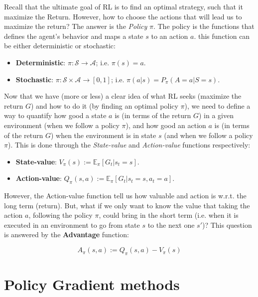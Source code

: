 \documentclass[twoside,twocolumn]{article}
\begin{document}
Recall that the ultimate goal of RL is to find an optimal strategy, such that it maximize the Return. However, how to choose the actions that will lead us to maximize the return? The answer is the \emph{Policy} $\pi$. The policy is the functions that defines the agent’s behavior and maps a state $s$ to an action $a$. this function can be either deterministic or stochastic:

\begin{itemize}
  \item \textbf{Deterministic}: $\pi: \mathcal{S} \rightarrow \mathcal{A}$; i.e. $\pi(s)=a$.
  \item \textbf{Stochastic}: $\pi: \mathcal{S} \times \mathcal{A} \rightarrow [0, 1]$; i.e. $\pi(a|s)=P_{\pi}(A=a|S=s)$.
\end{itemize}

Now that we have (more or less) a clear idea of what RL seeks (maximize the return $G$) and how to do it (by finding an optimal policy $\pi$), we need to define a way to quantify how good a state $a$ is (in terms of the return $G$) in a given environment (when we follow a policy $\pi$), and how good an action $a$ is (in terms of the return $G$) when the environment is in state $s$ (and when we follow a policy $\pi$). This is done through the \emph{State-value} and \emph{Action-value} functions respectively:
\begin{itemize}
    \item \textbf{State-value}: $V_{\pi}(s):= \mathbb{E}_{\pi}[G_t|s_t=s]$.
    \item \textbf{Action-value}: $Q_{\pi}(s, a):= \mathbb{E}_{\pi}[G_t|s_t=s, a_t=a]$.
\end{itemize}

\noindent However, the Action-value function tell us how valuable and action is w.r.t. the long term (return). But, what if we only want to know the value that taking the action $a$, following the policy $\pi$, could bring in the short term (i.e. when it is executed in an environment to go from state $s$ to the next one $s'$)? This question is answered by the \textbf{Advantage} function:

\begin{equation}
  A_{\pi}(s,a):=Q_{\pi}(s, a) - V_{\pi}(s)
\end{equation}



\section{Policy Gradient methods}
\end{document}
